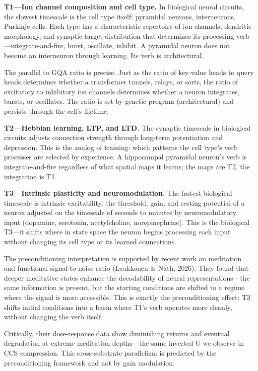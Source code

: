 \documentclass[12pt]{article}
\begin{document}
\textbf{T1---Ion channel composition and cell type.} In biological neural circuits, the slowest timescale is the cell type itself: pyramidal neurons, interneurons, Purkinje cells. Each type has a characteristic repertoire of ion channels, dendritic morphology, and synaptic target distribution that determines its processing verb---integrate-and-fire, burst, oscillate, inhibit. A pyramidal neuron does not become an interneuron through learning. Its verb is architectural.

The parallel to GQA ratio is precise. Just as the ratio of key-value heads to query heads determines whether a transformer tunnels, relays, or sorts, the ratio of excitatory to inhibitory ion channels determines whether a neuron integrates, bursts, or oscillates. The ratio is set by genetic program (architectural) and persists through the cell's lifetime.

\textbf{T2---Hebbian learning, LTP, and LTD.} The synaptic timescale in biological circuits adjusts connection strength through long-term potentiation and depression. This is the analog of training: which patterns the cell type's verb processes are selected by experience. A hippocampal pyramidal neuron's verb is integrate-and-fire regardless of what spatial maps it learns; the maps are T2, the integration is T1.

\textbf{T3---Intrinsic plasticity and neuromodulation.} The fastest biological timescale is intrinsic excitability: the threshold, gain, and resting potential of a neuron adjusted on the timescale of seconds to minutes by neuromodulatory input (dopamine, serotonin, acetylcholine, norepinephrine). This is the biological T3---it shifts where in state space the neuron begins processing each input without changing its cell type or its learned connections.

The preconditioning interpretation is supported by recent work on meditation and functional signal-to-noise ratio (Laukkonen \& Nath, 2026). They found that deeper meditative states enhance the decodability of neural representations---the same information is present, but the starting conditions are shifted to a regime where the signal is more accessible. This is exactly the preconditioning effect: T3 shifts initial conditions into a basin where T1's verb operates more cleanly, without changing the verb itself.

Critically, their dose-response data show diminishing returns and eventual degradation at extreme meditation depths---the same inverted-U we observe in CCS compression. This cross-substrate parallelism is predicted by the preconditioning framework and not by gain modulation.
\end{document}
